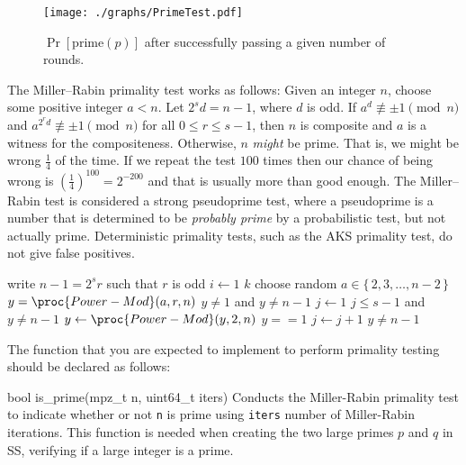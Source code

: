 \begin{figure}[tbhp]
\centering
\texttt{[image: ./graphs/PrimeTest.pdf]}
\caption{$\Pr[\text{prime}(p)]$ after successfully passing a given number of rounds.}\label{fig:tests}
\end{figure}

The Miller–Rabin primality test works as follows: Given an integer $n$,
choose some positive integer $a < n$. Let $2^s d = n - 1$, where $d$ is
odd. If $a^d \not\equiv \pm 1 \pmod{n}$ and $a^{{2^r} d} \not\equiv \pm
1 \pmod{n}$ for all $0 \le r \le s - 1$, then $n$ is composite and $a$
is a witness for the compositeness. Otherwise, $n$ \emph{might} be
prime. That is, we might be wrong $\frac{1}{4}$ of the time. If we
repeat the test $100$ times then our chance of being wrong is
$(\frac{1}{4})^{100} = 2^{-200}$ and that is usually more than good
enough. The Miller–Rabin test is considered a strong pseudoprime test,
where a pseudoprime is a number that is determined to be \emph{probably
prime} by a probabilistic test, but not actually prime. Deterministic
primality tests, such as the AKS primality test, do not give false
positives.

\begin{codebox}
  \li write $n - 1 = 2^sr$ such that $r$ is odd
  \li \For $i \gets 1$ \To $k$
  \li \Then choose random $a \in \{\,2,3,\dots,n-2\,\}$
  \li       $y = \proc{Power-Mod}(a, r, n)$
  \li       \If $y \ne 1$ and $y \ne n - 1$
  \li       \Then $j \gets 1$
  \li             \While $j \le s - 1$ and $y \ne n - 1$
  \li             \Then $y \gets \proc{Power-Mod}(y, 2, n)$
  \li                   \If $y == 1$ \li \Then \Return {} \End
  \li                   $j \gets j + 1$
                  \End
  \li             \If $y \ne n - 1$ \li \Then \Return {} \End
            \End
      \End
  \li \Return {}
\end{codebox}

The function that you are expected to implement to perform primality
testing should be declared as follows:

\begin{funcdoc}{bool is\_prime(mpz\_t n, uint64\_t iters)}
  Conducts the Miller-Rabin primality test to indicate whether or not
  \texttt{n} is prime using \texttt{iters} number of Miller-Rabin
  iterations. This function is needed when creating the two large primes
  $p$ and $q$ in SS, verifying if a large integer is a prime.
\end{funcdoc}

